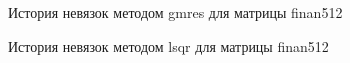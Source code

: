 \begin{figure}[H]
    \renewcommand{\figurename}{Рисунок}
    \caption{История невязок методом gmres для матрицы finan512}
    \label{fig:image_37}
\end{figure}

\begin{figure}[H]
    \renewcommand{\figurename}{Рисунок}
    \caption{История невязок методом lsqr для матрицы finan512}
    \label{fig:image_38}
\end{figure}

